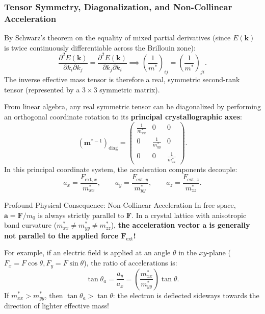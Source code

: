 \documentclass[11pt,a4paper]{article}
\newcommand{\vb}[1]{\mathbf{#1}}
\newcommand{\kk}{\mathbf{k}}
\begin{document}
\subsubsection{Tensor Symmetry, Diagonalization, and Non-Collinear Acceleration}
By Schwarz's theorem on the equality of mixed partial derivatives (since $E(\kk)$ is twice continuously differentiable across the Brillouin zone):
\begin{equation}
    \frac{\partial^2 E(\kk)}{\partial k_i \partial k_j} = \frac{\partial^2 E(\kk)}{\partial k_j \partial k_i} \implies \left(\frac{1}{m^*}\right)_{ij} = \left(\frac{1}{m^*}\right)_{ji}.
\end{equation}
The inverse effective mass tensor is therefore a real, symmetric second-rank tensor (represented by a $3\times 3$ symmetric matrix). 

From linear algebra, any real symmetric tensor can be diagonalized by performing an orthogonal coordinate rotation to its \textbf{principal crystallographic axes}:
\begin{equation}
    (\vb{m}^{*-1})_{\mathrm{diag}} = \begin{pmatrix}
        \frac{1}{m_{xx}^*} & 0 & 0 \\
        0 & \frac{1}{m_{yy}^*} & 0 \\
        0 & 0 & \frac{1}{m_{zz}^*}
    \end{pmatrix}.
\end{equation}
In this principal coordinate system, the acceleration components decouple:
\begin{equation}
    a_x = \frac{F_{\mathrm{ext},x}}{m_{xx}^*}, \qquad a_y = \frac{F_{\mathrm{ext},y}}{m_{yy}^*}, \qquad a_z = \frac{F_{\mathrm{ext},z}}{m_{zz}^*}.
\end{equation}

\begin{takeawaybox}{Profound Physical Consequence: Non-Collinear Acceleration}
In free space, $\vb{a} = \vb{F}/m_0$ is always strictly parallel to $\vb{F}$. In a crystal lattice with anisotropic band curvature ($m_{xx}^* \neq m_{yy}^* \neq m_{zz}^*$), \textbf{the acceleration vector $\vb{a}$ is generally not parallel to the applied force $\vb{F}_{\mathrm{ext}}$!} 

For example, if an electric field is applied at an angle $\theta$ in the $xy$-plane ($F_x = F\cos\theta, F_y = F\sin\theta$), the ratio of accelerations is:
\begin{equation}
    \tan\theta_a = \frac{a_y}{a_x} = \left(\frac{m_{xx}^*}{m_{yy}^*}\right)\tan\theta.
\end{equation}
If $m_{xx}^* > m_{yy}^*$, then $\tan\theta_a > \tan\theta$: the electron is deflected sideways towards the direction of lighter effective mass!
\end{takeawaybox}
\end{document}
